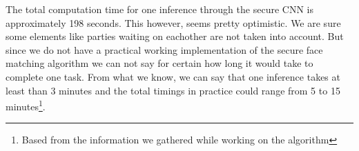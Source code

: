 The total computation time for one inference through the secure CNN is approximately 198 seconds. This however, seems pretty optimistic. We are sure some elements like parties waiting on eachother are not taken into account. But since we do not have a practical working implementation of the secure face matching algorithm we can not say for certain how long it would take to complete one task. From what we know, we can say that one inference takes at least than 3 minutes and the total timings in practice could range from 5 to 15 minutes\footnote{Based from the information we gathered while working on the algorithm}.
